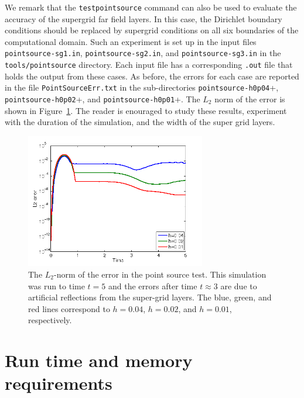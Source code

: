 \documentclass[11pt]{report}
\begin{document}
We remark that the \verb+testpointsource+ command can also be used to evaluate the accuracy of the
supergrid far field layers. In this case, the Dirichlet boundary conditions should be replaced by
supergrid conditions on all six boundaries of the computational domain. Such an experiment is set up
in the input files \verb+pointsource-sg1.in+, \verb+pointsource-sg2.in+, and
\verb+pointsource-sg3.in+ in the \verb+tools/pointsource+ directory. Each input file has a
corresponding \verb+.out+ file that holds the output from these cases. As before, the errors for
each case are reported in the file \verb+PointSourceErr.txt+ in the sub-directories
\verb+pointsource-h0p04++, \verb+pointsource-h0p02++, and \verb+pointsource-h0p01++. The $L_2$ norm
of the error is shown in Figure~\ref{fig:sg-error}. The reader is enouraged to study these results,
experiment with the duration of the simulation, and the width of the super grid layers.
\begin{figure}[ht]
\begin{center}
\includegraphics[width=0.7\textwidth]{figures/sg-ps-err.png}
\caption{The $L_2$-norm of the error in the point source test. This simulation was run to time $t=5$
  and the errors after time $t\approx 3$ are due to artificial reflections from the super-grid
  layers. The blue, green, and red lines 
  correspond to $h=0.04$, $h=0.02$, and $h=0.01$, respectively.}
\label{fig:sg-error}
\end{center}
\end{figure}

\chapter{Run time and memory requirements }\label{sec:performance}
\end{document}
